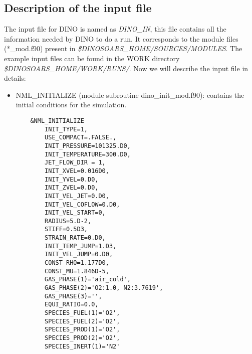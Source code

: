 \subsection{Description of the input file}
The input file for DINO is named as \textit{DINO\_IN}, this file contains all the information needed by DINO to do a run. It corresponds to the module files (*\_mod.f90) present in \textit{\$DINOSOARS\_HOME/SOURCES/MODULES}. The example input files can be found in the WORK directory \textit{\$DINOSOARS\_HOME/WORK/RUNS/}. Now we will describe the input file in details:
\begin{itemize}
  \item NML\_INITIALIZE (module subroutine dino\_init\_mod.f90): contains the initial conditions for the simulation.
  \begin{lstlisting}
    &NML_INITIALIZE
        INIT_TYPE=1,
        USE_COMPACT=.FALSE.,
        INIT_PRESSURE=101325.D0,
        INIT_TEMPERATURE=300.D0,
        JET_FLOW_DIR = 1,
        INIT_XVEL=0.016D0,
        INIT_YVEL=0.D0,
        INIT_ZVEL=0.D0,
        INIT_VEL_JET=0.D0,
        INIT_VEL_COFLOW=0.D0,
        INIT_VEL_START=0,
        RADIUS=5.D-2,
        STIFF=0.5D3,
        STRAIN_RATE=0.D0,
        INIT_TEMP_JUMP=1.D3,
        INIT_VEL_JUMP=0.D0,
        CONST_RHO=1.177D0,
        CONST_MU=1.846D-5,
        GAS_PHASE(1)='air_cold',
        GAS_PHASE(2)='O2:1.0, N2:3.7619',
        GAS_PHASE(3)='',
        EQUI_RATIO=0.0,
        SPECIES_FUEL(1)='O2',
        SPECIES_FUEL(2)='O2',
        SPECIES_PROD(1)='O2',
        SPECIES_PROD(2)='O2',
        SPECIES_INERT(1)='N2'
  \end{lstlisting}

\end{itemize}
